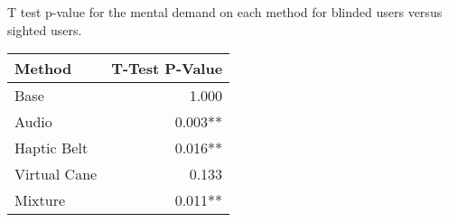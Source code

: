 
\centering
\caption{T test p-value for the mental demand on each method for blinded users versus sighted users.}
\label{tab:ttest_mental_demand}
\begin{tabular}{lr}
\toprule
      Method & T-Test P-Value \\
\midrule
        Base &          1.000 \\
       Audio &        0.003** \\
 Haptic Belt &        0.016** \\
Virtual Cane &          0.133 \\
     Mixture &        0.011** \\
\bottomrule
\end{tabular}
